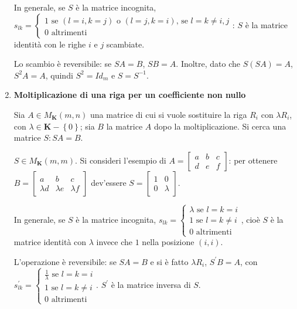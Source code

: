 \documentclass{article}
\begin{document}
\begin{enumerate}
In generale, se $S$ \`{e} la matrice incognita, $s_{lk}=\left\{ 
\begin{array}{c}
1\text{ se }\left( l=i,k=j\right) \text{ o }\left( l=j,k=i\right) \text{, se 
}l=k\neq i,j \\ 
0\text{ altrimenti}%
\end{array}%
\right. $: $S$ \`{e} la matrice identit\`{a} con le righe $i$ e $j$
scambiate.

Lo scambio \`{e} reversibile: se $SA=B$, $SB=A$. Inoltre, dato che $S\left(
SA\right) =A$, $S^{2}A=A$, quindi $S^{2}=Id_{m}$ e $S=S^{-1}$.

\item \textbf{Moltiplicazione di una riga per un coefficiente non nullo}

Sia $A\in M_{\mathbf{K}}\left( m,n\right) $ una matrice di cui si vuole
sostituire la riga $R_{i}$ con $\lambda R_{i}$, con $\lambda \in \mathbf{K}%
-\left\{ 0\right\} $; sia $B$ la matrice $A$ dopo la moltiplicazione. Si
cerca una matrice $S:SA=B$.

$S\in M_{\mathbf{K}}\left( m,m\right) $. Si consideri l'esempio di $A=\left[ 
\begin{array}{ccc}
a & b & c \\ 
d & e & f%
\end{array}%
\right] $: per ottenere $B=\left[ 
\begin{array}{ccc}
a & b & c \\ 
\lambda d & \lambda e & \lambda f%
\end{array}%
\right] $ dev'essere $S=\left[ 
\begin{array}{cc}
1 & 0 \\ 
0 & \lambda%
\end{array}%
\right] $.

In generale, se $S$ \`{e} la matrice incognita, $s_{lk}=\left\{ 
\begin{array}{c}
\lambda \text{ se }l=k=i \\ 
1\text{ se }l=k\neq i \\ 
0\text{ altrimenti}%
\end{array}%
\right. $, cio\`{e} $S$ \`{e} la matrice identit\`{a} con $\lambda $ invece
che $1$ nella posizione $\left( i,i\right) $.

L'operazione \`{e} reversibile: se $SA=B$ e si \`{e} fatto $\lambda R_{i}$, $%
S^{\prime }B=A$, con $s_{lk}^{\prime }=\left\{ 
\begin{array}{c}
\frac{1}{\lambda }\text{ se }l=k=i \\ 
1\text{ se }l=k\neq i \\ 
0\text{ altrimenti}%
\end{array}%
\right. $. $S^{\prime }$ \`{e} la matrice inversa di $S$.


\end{enumerate}
\end{document}
